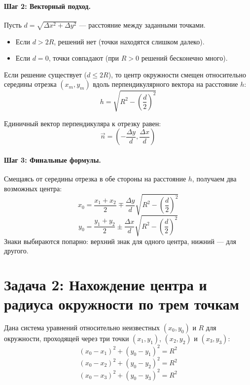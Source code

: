 \documentclass[12pt,a4paper]{article}
\begin{document}
\paragraph{Шаг 2: Векторный подход.}
Пусть $d = \sqrt{\Delta x^2 + \Delta y^2}$ — расстояние между заданными точками.
\begin{itemize}
    \item Если $d > 2R$, решений нет (точки находятся слишком далеко).
    \item Если $d = 0$, точки совпадают (при $R > 0$ решений бесконечно много).
\end{itemize}

Если решение существует ($d \le 2R$), то центр окружности смещен относительно середины отрезка $(x_m, y_m)$ вдоль перпендикулярного вектора на расстояние $h$:
\[
h = \sqrt{R^2 - \left(\frac{d}{2}\right)^2}
\]

Единичный вектор перпендикуляра к отрезку равен:
\[
\vec{n} = \left(-\frac{\Delta y}{d}, \frac{\Delta x}{d}\right)
\]

\paragraph{Шаг 3: Финальные формулы.}
Смещаясь от середины отрезка в обе стороны на расстояние $h$, получаем два возможных центра:
\begin{equation}
x_0 = \frac{x_1 + x_2}{2} \mp \frac{\Delta y}{d} \sqrt{R^2 - \left(\frac{d}{2}\right)^2}
\end{equation}
\begin{equation}
y_0 = \frac{y_1 + y_2}{2} \pm \frac{\Delta x}{d} \sqrt{R^2 - \left(\frac{d}{2}\right)^2}
\end{equation}
Знаки выбираются попарно: верхний знак для одного центра, нижний — для другого.

\newpage

\section{Задача 2: Нахождение центра и радиуса окружности по трем точкам}

Дана система уравнений относительно неизвестных $(x_0, y_0)$ и $R$ для окружности, проходящей через три точки $(x_1, y_1)$, $(x_2, y_2)$ и $(x_3, y_3)$:
\begin{equation}
(x_0 - x_1)^2 + (y_0 - y_1)^2 = R^2
\end{equation}
\begin{equation}
(x_0 - x_2)^2 + (y_0 - y_2)^2 = R^2
\end{equation}
\begin{equation}
(x_0 - x_3)^2 + (y_0 - y_3)^2 = R^2
\end{equation}
\end{document}
